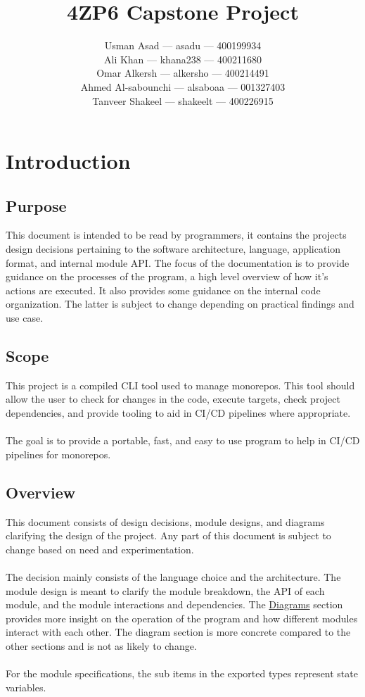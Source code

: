 \documentclass[11pt]{article}
\title{\textbf{4ZP6 Capstone Project}}
\author{Usman Asad --- asadu  --- 400199934\\
  Ali Khan --- khana238  --- 400211680\\
  Omar Alkersh --- alkersho --- 400214491 \\
  Ahmed Al-sabounchi --- alsaboaa --- 001327403 \\
  Tanveer Shakeel --- shakeelt --- 400226915}
\begin{document}
\maketitle
\tableofcontents
\newpage

\section{Introduction}

\subsection{Purpose}

This document is intended to be read by programmers, it contains the projects design
decisions pertaining to the software architecture, language, application format,
and internal module API. The focus of the documentation is to provide guidance on the
processes of the program, a high level overview of how it's actions are executed. It
also provides some guidance on the internal code organization. The latter is subject
to change depending on practical findings and use case.

\subsection{Scope}

This project is a compiled \Gls{CLI} tool used to manage \glspl{monorepo}. This
tool should allow the user to check for changes in the code, execute \glspl{target},
check project dependencies, and provide tooling to aid in \Gls{CI/CD} pipelines
where appropriate.
\\\\
The goal is to provide a portable, fast, and easy to use program to help in
CI/CD pipelines for \glspl{monorepo}.

\subsection{Overview}

This document consists of design decisions, module designs, and diagrams
clarifying the design of the project. Any part of this document is subject to
change based on need and experimentation.
\\\\
The decision mainly consists of the language choice and the architecture. The
module design is meant to clarify the module breakdown, the API of each module,
and the module interactions and dependencies. The
\hyperref[sec:diagrams]{Diagrams} section provides more insight on the operation
of the program and how different modules interact with each other. The diagram
section is more concrete compared to the other sections and is not as likely
to change.
\\\\
For the module specifications, the sub items in the exported types represent
state variables.
\end{document}
